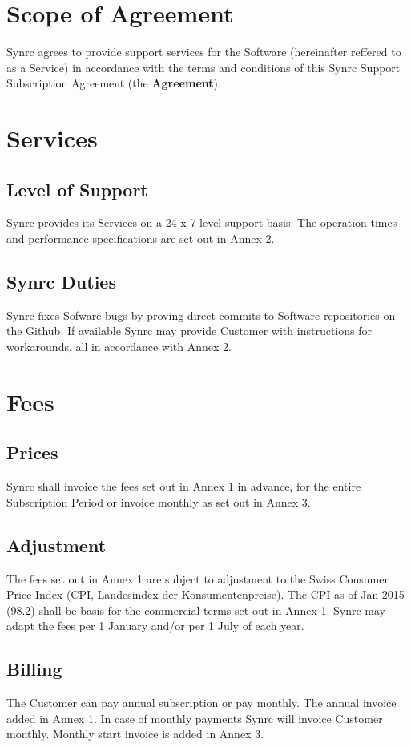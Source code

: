 \documentclass[11pt,oneside]{article}
\begin{document}
\newpage
\section{Scope of Agreement}
Synrc agrees to provide support services for the Software (hereinafter
reffered to as a Service) in accordance with the terms and conditions
of this Synrc Support Subscription Agreement (the {\bf Agreement}).

\section{Services}
\subsection{Level of Support}
Synrc provides its Services on a 24 x 7 level support basis. The operation
times and performance specifications are set out in Annex 2.
\subsection{Synrc Duties}
Synrc fixes Sofware bugs by proving direct commits to Software
repositories on the Github. If available Synrc may provide Customer
with instructions for workarounds, all in accordance with Annex 2.

\section{Fees}
\subsection{Prices}
Synrc shall invoice the fees set out in Annex 1 in advance, for the
entire Subscription Period or invoice monthly as set out in Annex 3.
\subsection{Adjustment}
The fees set out in Annex 1 are subject to adjustment to the Swiss
Consumer Price Index (CPI, Landesindex der Konsumentenpreise).
The CPI as of Jan 2015 (98.2) shall be basis for the commercial terms
set out in Annex 1. Synrc may adapt the fees per 1 January and/or
per 1 July of each year.
\subsection{Billing}
The Customer can pay annual subscription or pay monthly. The annual
invoice added in Annex 1. In case of monthly payments Synrc
will invoice Customer monthly. Monthly start invoice is added in Annex 3.
\end{document}
